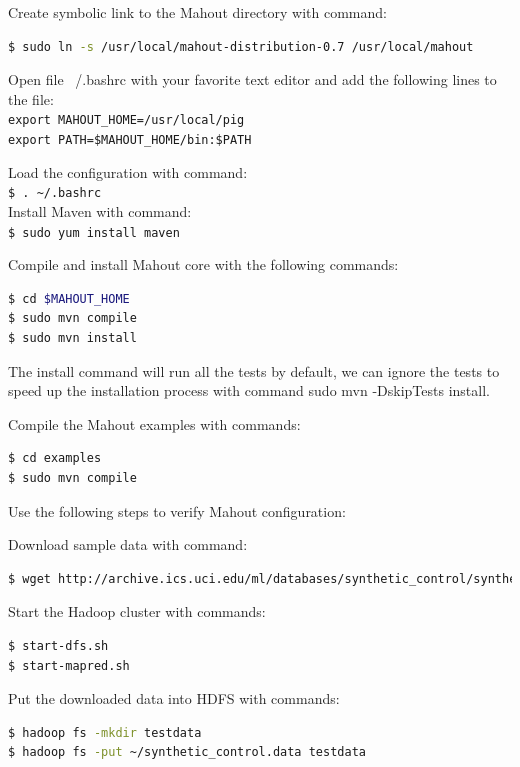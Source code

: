 Create symbolic link to the Mahout directory with command: 
\lstset{style=bashstyle}
\begin{lstlisting}[language=bash]
$ sudo ln -s /usr/local/mahout-distribution-0.7 /usr/local/mahout 
\end{lstlisting}

Open file ~/.bashrc with your favorite text editor and add the following lines to the file: \\
\verb|export MAHOUT_HOME=/usr/local/pig| \\
\verb|export PATH=$MAHOUT_HOME/bin:$PATH|

Load the configuration with command: \\
\verb|$ . ~/.bashrc| \\

Install Maven with command: \\
\verb|$ sudo yum install maven|

Compile and install Mahout core with the following commands:
\lstset{style=bashstyle}
\begin{lstlisting}[language=bash]
$ cd $MAHOUT_HOME
$ sudo mvn compile
$ sudo mvn install
\end{lstlisting}

The install command will run all the tests by default, we can ignore the tests to speed up the installation process with command sudo mvn -DskipTests install.

Compile the Mahout examples with commands:
\lstset{style=bashstyle}
\begin{lstlisting}[language=bash]
$ cd examples
$ sudo mvn compile
\end{lstlisting}

Use the following steps to verify Mahout configuration:

Download sample data with command:
\lstset{style=bashstyle}
\begin{lstlisting}[language=bash]
$ wget http://archive.ics.uci.edu/ml/databases/synthetic_control/synthetic_control.data -P ~/
\end{lstlisting}

Start the Hadoop cluster with commands:
\lstset{style=bashstyle}
\begin{lstlisting}[language=bash]
$ start-dfs.sh
$ start-mapred.sh
\end{lstlisting}

Put the downloaded data into HDFS with commands:
\lstset{style=bashstyle}
\begin{lstlisting}[language=bash]
$ hadoop fs -mkdir testdata
$ hadoop fs -put ~/synthetic_control.data testdata
\end{lstlisting}

